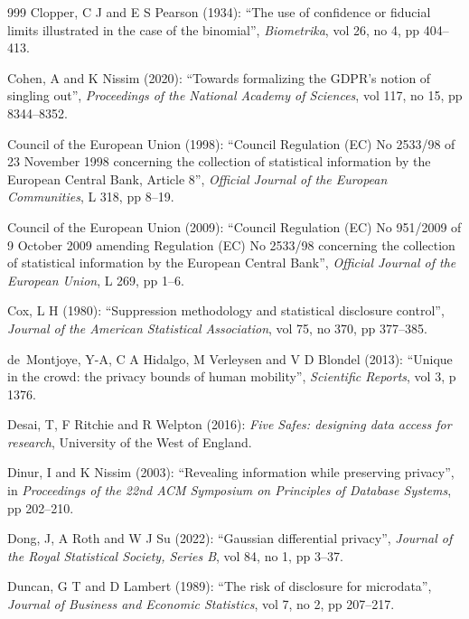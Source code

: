 \begin{thebibliography}{999}
Clopper, C J and E S Pearson (1934): ``The use of confidence or fiducial limits illustrated in the case of the binomial'', \emph{Biometrika}, vol 26, no 4, pp 404--413.

Cohen, A and K Nissim (2020): ``Towards formalizing the GDPR's notion of singling out'', \emph{Proceedings of the National Academy of Sciences}, vol 117, no 15, pp 8344--8352.

Council of the European Union (1998): ``Council Regulation (EC) No 2533/98 of 23 November 1998 concerning the collection of statistical information by the European Central Bank, Article 8'', \emph{Official Journal of the European Communities}, L 318, pp 8--19.

Council of the European Union (2009): ``Council Regulation (EC) No 951/2009 of 9 October 2009 amending Regulation (EC) No 2533/98 concerning the collection of statistical information by the European Central Bank'', \emph{Official Journal of the European Union}, L 269, pp 1--6.

Cox, L H (1980): ``Suppression methodology and statistical disclosure control'', \emph{Journal of the American Statistical Association}, vol 75, no 370, pp 377--385.

de~Montjoye, Y-A, C A Hidalgo, M Verleysen and V D Blondel (2013): ``Unique in the crowd: the privacy bounds of human mobility'', \emph{Scientific Reports}, vol 3, p 1376.

Desai, T, F Ritchie and R Welpton (2016): \emph{Five Safes: designing data access for research}, University of the West of England.

Dinur, I and K Nissim (2003): ``Revealing information while preserving privacy'', in \emph{Proceedings of the 22nd ACM Symposium on Principles of Database Systems}, pp 202--210.

Dong, J, A Roth and W J Su (2022): ``Gaussian differential privacy'', \emph{Journal of the Royal Statistical Society, Series B}, vol 84, no 1, pp 3--37.

Duncan, G T and D Lambert (1989): ``The risk of disclosure for microdata'', \emph{Journal of Business and Economic Statistics}, vol 7, no 2, pp 207--217.


\end{thebibliography}
